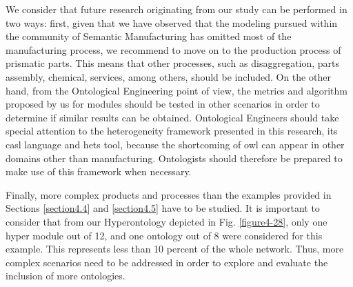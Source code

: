 We consider that future research originating from our study can be performed in two ways: first, given that we have observed that the modeling pursued within the community of Semantic Manufacturing has omitted most of the manufacturing process, we recommend to move on to the production process of prismatic parts. This means that other processes, such as disaggregation, parts assembly, chemical, services, among others, should be included. On the other hand, from the Ontological Engineering point of view, the metrics and algorithm proposed by us for modules should be tested in other scenarios in order to determine if similar results can be obtained. Ontological Engineers should take special attention to the heterogeneity framework presented in this research, its \gls{casl} language and \gls{hets} tool, because the shortcoming of \gls{owl} can appear in other domains other than manufacturing. Ontologists should therefore be prepared to make use of this framework when necessary.

Finally, more complex products and processes than the examples provided in Sections \ref{section4.4} and \ref{section4.5} have to be studied. It is important to consider that from our Hyperontology depicted in Fig. \ref{figure4-28}, only one hyper module out of 12, and one ontology out of 8 were considered for this example. This represents less than 10 percent of the whole network. Thus, more complex scenarios need to be addressed in order to explore and evaluate the inclusion of more ontologies.